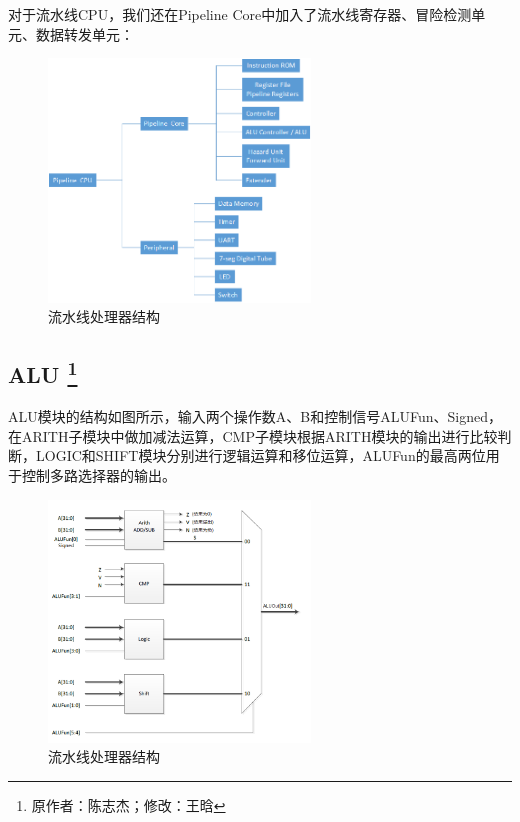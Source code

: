 \documentclass{article}
\begin{document}
            对于流水线CPU，我们还在Pipeline Core中加入了流水线寄存器、冒险检测单元、数据转发单元：
            \begin{figure}[H]
                    \centering
                    \includegraphics[width=0.62\textwidth]{images/pipeline.png}
                    \caption{\label{fig:pipeline}流水线处理器结构}
                \end{figure}

        \subsection{ALU \protect\footnote{原作者：陈志杰；修改：王晗}}
            ALU模块的结构如图所示，输入两个操作数A、B和控制信号ALUFun、Signed，在ARITH子模块中做加减法运算，CMP子模块根据ARITH模块的输出进行比较判断，LOGIC和SHIFT模块分别进行逻辑运算和移位运算，ALUFun的最高两位用于控制多路选择器的输出。
            \begin{figure}[H]
                    \centering
                    \includegraphics[width=0.62\textwidth]{images/ALU.png}
                    \caption{\label{fig:ALU}流水线处理器结构}
                \end{figure}
\end{document}
